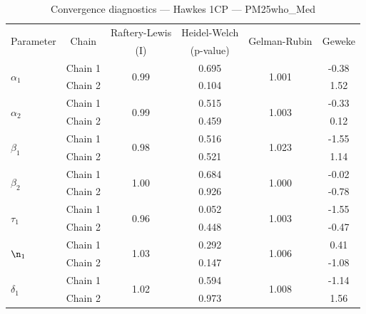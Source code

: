 \begin{table}[H]
\centering
\caption{Convergence diagnostics — Hawkes 1CP — PM25who_Med}
\begin{tabular}{lccccc}
\toprule
\multirow{2}{*}{Parameter} & \multirow{2}{*}{Chain} & Raftery-Lewis & Heidel-Welch & \multirow{2}{*}{Gelman-Rubin} & \multirow{2}{*}{Geweke} \\
 & & (I) & (p-value) & & (z) \\
\midrule
\multirow{2}{*}{$\alpha_1$} & Chain 1 & \multirow{2}{*}{0.99} & 0.695 & \multirow{2}{*}{1.001} & -0.38 \\
 & Chain 2 & & 0.104 & & 1.52 \\
\multirow{2}{*}{$\alpha_2$} & Chain 1 & \multirow{2}{*}{0.99} & 0.515 & \multirow{2}{*}{1.003} & -0.33 \\
 & Chain 2 & & 0.459 & & 0.12 \\
\midrule
\multirow{2}{*}{$\beta_1$} & Chain 1 & \multirow{2}{*}{0.98} & 0.516 & \multirow{2}{*}{1.023} & -1.55 \\
 & Chain 2 & & 0.521 & & 1.14 \\
\multirow{2}{*}{$\beta_2$} & Chain 1 & \multirow{2}{*}{1.00} & 0.684 & \multirow{2}{*}{1.000} & -0.02 \\
 & Chain 2 & & 0.926 & & -0.78 \\
\midrule
\multirow{2}{*}{$\tau_1$} & Chain 1 & \multirow{2}{*}{0.96} & 0.052 & \multirow{2}{*}{1.003} & -1.55 \\
 & Chain 2 & & 0.448 & & -0.47 \\
\midrule
\multirow{2}{*}{$\n_1$} & Chain 1 & \multirow{2}{*}{1.03} & 0.292 & \multirow{2}{*}{1.006} & 0.41 \\
 & Chain 2 & & 0.147 & & -1.08 \\
\midrule
\multirow{2}{*}{$\delta_1$} & Chain 1 & \multirow{2}{*}{1.02} & 0.594 & \multirow{2}{*}{1.008} & -1.14 \\
 & Chain 2 & & 0.973 & & 1.56 \\
\bottomrule
\end{tabular}
\end{table}
